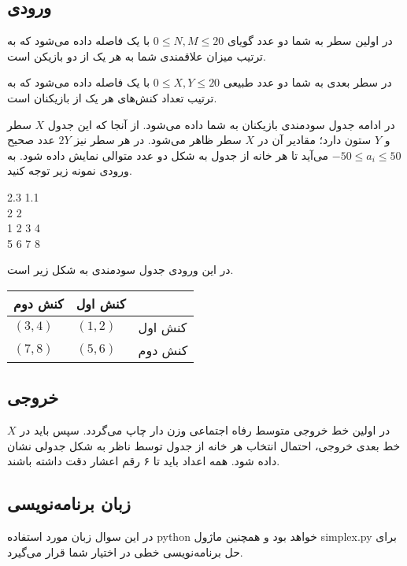 \subsection*{ورودی}
در اولین سطر به شما دو عدد گویای $0 \leq N, M \leq 20$ با یک فاصله داده می‌شود که به ترتیب میزان علاقمندی شما به هر یک از دو بازیکن است.

در سطر بعدی به شما دو عدد طبیعی $0 \leq X, Y \leq 20$ با یک فاصله داده می‌شود که به ترتیب تعداد کنش‌های هر یک از بازیکنان است.

در ادامه جدول سودمندی بازیکنان به شما داده می‌شود. از آنجا که این جدول $X$ سطر و $Y$ ستون دارد؛ مقادیر آن در $X$ سطر ظاهر می‌شود. در هر سطر نیز $2Y$ عدد صحیح $-50 \leq a_i \leq 50$ می‌آید تا هر خانه از جدول به شکل دو عدد متوالی نمایش داده شود. به ورودی نمونه زیر توجه کنید.
\LTR
\begin{latin}
\begin{examplebox}
    2.3 1.1 \\
    2 2 \\
    1 2 3 4 \\
    5 6 7 8
\end{examplebox}
\end{latin}
\RTL
در این ورودی جدول سودمندی به شکل زیر است.
\begin{center}
    \begin{tabularx}{0.7\textwidth}{|Y|Y|Y|}
        \hline
        کنش دوم & کنش اول &  \\
        \hline
        $(3,4)$ & $(1,2)$ & کنش اول \\
        \hline
        $(7,8)$ & $(5,6)$ & کنش دوم \\
        \hline
    \end{tabularx}
    \end{center}

\subsection*{خروجی}
در اولین خط خروجی متوسط رفاه اجتماعی وزن دار چاپ می‌گردد. 
سپس باید در $X$ خط بعدی خروجی، احتمال انتخاب هر خانه از جدول توسط ناظر به شکل جدولی نشان داده شود. همه اعداد باید تا ۶ رقم اعشار دقت داشته باشند.

\subsection*{زبان برنامه‌نویسی}
در این سوال زبان مورد استفاده python خواهد بود و همچنین ماژول simplex.py برای حل برنامه‌نویسی خطی در اختیار شما قرار می‌گیرد.

